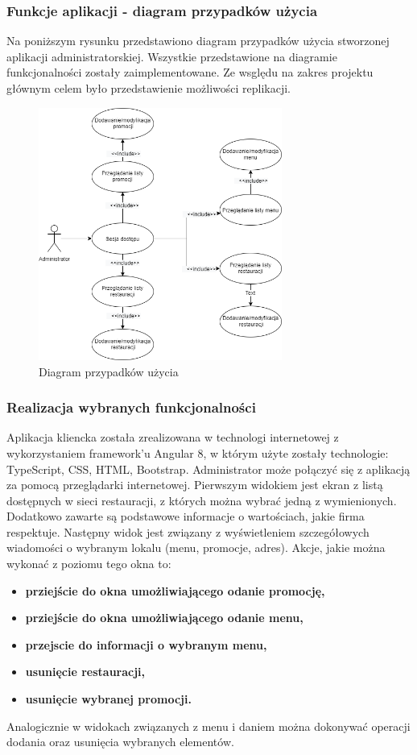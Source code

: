 \documentclass{article}
\begin{document}
		\subsubsection{Funkcje aplikacji - diagram przypadków użycia}
		Na poniższym rysunku przedstawiono diagram przypadków użycia stworzonej aplikacji administratorskiej. Wszystkie przedstawione na diagramie funkcjonalności zostały zaimplementowane. Ze wsględu na zakres projektu głównym celem było przedstawienie możliwości replikacji.
			\begin{figure}[hbt!]
				\includegraphics[width=8cm]{Files/Pictures/UMLAdminApp}
				\centering
				\caption{Diagram przypadków użycia}
			\end{figure}
		\subsubsection{Realizacja wybranych funkcjonalności}
		Aplikacja kliencka została zrealizowana w technologi internetowej z wykorzystaniem framework'u Angular 8, w którym użyte zostały technologie:  TypeScript, CSS, HTML, Bootstrap. Administrator może połączyć się z aplikacją za pomocą przeglądarki internetowej. Pierwszym widokiem jest ekran z listą dostępnych w sieci restauracji, z których można wybrać jedną z wymienionych. Dodatkowo zawarte są podstawowe informacje o wartościach, jakie firma respektuje. Następny widok jest związany z wyświetleniem szczegółowych wiadomości o wybranym lokalu (menu, promocje, adres). Akcje, jakie można wykonać z poziomu tego okna to:
		\newpage
		\begin{itemize}
				\item
					\textbf{prziejście do okna umożliwiającego odanie promocję,} 
				\item
					\textbf{prziejście do okna umożliwiającego odanie menu,}
				\item
					\textbf{przejscie do informacji o wybranym menu,}
				\item
					\textbf{usunięcie restauracji,}
				\item
					\textbf{usunięcie wybranej promocji.}
			\end{itemize}
			Analogicznie w widokach związanych z menu i daniem można dokonywać operacji  dodania oraz usunięcia wybranych elementów.
\end{document}
